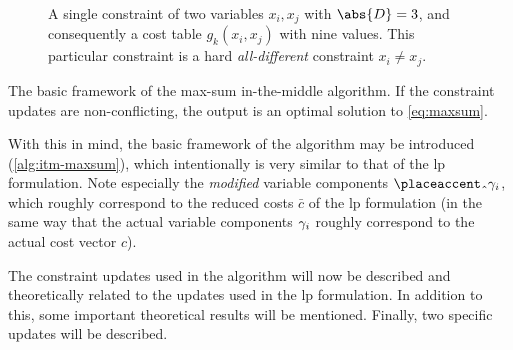 \begin{figure}[p]
	\centering
	
	\caption{A single constraint of two variables \(x_i,x_j\) with \(\abs{D}=3\), and consequently a cost table \(g_k(x_i,x_j)\) with nine values. This particular constraint is a hard \emph{all-different} constraint \(x_i\neq x_j\).}
	\label{fig:maxsum-components}
\end{figure}

\begin{algorithm}[p]

	\caption{
		The basic framework of the max-sum in-the-middle algorithm.
		If the constraint updates are non-conflicting, the output is an optimal solution to \cref{eq:maxsum}.
	}
	\label{alg:itm-maxsum}
\end{algorithm}

With this in mind, the basic framework of the algorithm may be introduced (\cref{alg:itm-maxsum}), which intentionally is very similar to that of the \gls{lp} formulation.
Note especially the \emph{modified} variable components \(\hat{\vcomp}_i\), which roughly correspond to the reduced costs \(\bar{c}\) of the \gls{lp} formulation (in the same way that the actual variable components \(\gamma_i\) roughly correspond to the actual cost vector \(c\)).

The constraint updates used in the algorithm will now be described and theoretically related to the updates used in the \gls{lp} formulation. In addition to this, some important theoretical results will be mentioned.
Finally, two specific updates will be described.

